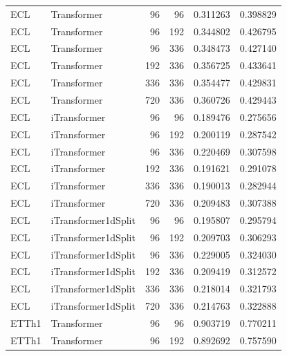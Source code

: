 \documentclass[stu,12pt,floatsintext]{apa7}
\begin{document}
\begin{longtable}{llrrrr}
\bottomrule
\endlastfoot
ECL &         Transformer &            96 &             96 & 0.311263 & 0.398829 \\
         ECL &         Transformer &            96 &            192 & 0.344802 & 0.426795 \\
         ECL &         Transformer &            96 &            336 & 0.348473 & 0.427140 \\
         ECL &         Transformer &           192 &            336 & 0.356725 & 0.433641 \\
         ECL &         Transformer &           336 &            336 & 0.354477 & 0.429831 \\
         ECL &         Transformer &           720 &            336 & 0.360726 & 0.429443 \\
         ECL &        iTransformer &            96 &             96 & 0.189476 & 0.275656 \\
         ECL &        iTransformer &            96 &            192 & 0.200119 & 0.287542 \\
         ECL &        iTransformer &            96 &            336 & 0.220469 & 0.307598 \\
         ECL &        iTransformer &           192 &            336 & 0.191621 & 0.291078 \\
         ECL &        iTransformer &           336 &            336 & 0.190013 & 0.282944 \\
         ECL &        iTransformer &           720 &            336 & 0.209483 & 0.307388 \\
         ECL & iTransformer1dSplit &            96 &             96 & 0.195807 & 0.295794 \\
         ECL & iTransformer1dSplit &            96 &            192 & 0.209703 & 0.306293 \\
         ECL & iTransformer1dSplit &            96 &            336 & 0.229005 & 0.324030 \\
         ECL & iTransformer1dSplit &           192 &            336 & 0.209419 & 0.312572 \\
         ECL & iTransformer1dSplit &           336 &            336 & 0.218014 & 0.321793 \\
         ECL & iTransformer1dSplit &           720 &            336 & 0.214763 & 0.322888 \\
       ETTh1 &         Transformer &            96 &             96 & 0.903719 & 0.770211 \\
       ETTh1 &         Transformer &            96 &            192 & 0.892692 & 0.757590 \\

\end{longtable}
\end{document}
